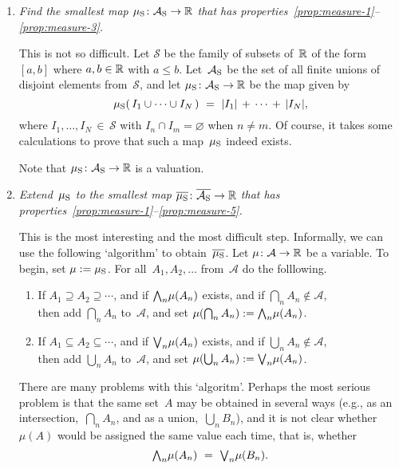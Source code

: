 \documentclass[main.tex]{subfiles}
\begin{document}
\begin{enumerate}
\item
\emph{Find the smallest map $\mu_{\mathrm{S}}\colon \mathcal{A}_{\mathrm{S}}\rightarrow \mathbb{R}$
that has properties~\ref{prop:measure-1}--\ref{prop:measure-3}.}

This is not so difficult.
Let $\mathcal{S}$ be the family of subsets of~$\mathbb{R}$ of
the form~$[a,b]$ where $a,b\in \mathbb{R}$ with $a\leq b$.
Let~$\mathcal{A}_{\mathrm{S}}$ be the set of all finite unions
of disjoint elements from~$\mathcal{S}$,
and let $\mu_{\mathrm{S}}\colon \mathcal{A}_{\mathrm{S}}\rightarrow \mathbb{R}$
be the map given by
\begin{equation*}
\mu_{\mathrm{S}}(\,I_1 \cup\dotsb\cup I_N\,) \ = \ |I_1| \,+\,\dotsb\,+\,|I_N|,
\end{equation*}
where $I_1,\dotsc,I_N\,\in\, \mathcal{S}$
with $I_n\cap I_m = \varnothing$ when $n\neq m$.
Of course, it takes some calculations
to prove that such a map~$\mu_{\mathrm{S}}$ indeed exists.

Note that $\mu_{\mathrm{S}}\colon \mathcal{A}_{\mathrm{S}}\rightarrow \mathbb{R}$ is a valuation.

\item
\emph{Extend~$\mu_{\mathrm{S}}$
to the smallest map $\overline{\mu_{\mathrm{S}}}\colon\overline{\mathcal{A}_{\mathrm{S}}}\rightarrow\mathbb{R}$
that has properties~\ref{prop:measure-1}--\ref{prop:measure-5}.}

This is the most interesting and the most difficult step.
Informally,
we can use the following `algorithm' to obtain~$\overline{\mu_{\mathrm{S}}}$.
Let $\mu\colon\mathcal{A} \rightarrow \mathbb{R}$
be a variable. To begin, set $\mu := \mu_{\mathrm{S}}$.
For all~$A_1,A_2,\dotsc$ from~$\mathcal{A}$ do the folllowing.
\begin{enumerate}
\item If $A_1 \supseteq A_2 \supseteq \dotsb$,
and if $\textstyle{\bigwedge}_n \mu(A_n)$ exists,
and if $\bigcap_n A_n \notin \mathcal{A}$,\\
then add $\bigcap_n A_n$ to~$\mathcal{A}$,
and set $\mu(\bigcap_n A_n) := \textstyle{\bigwedge}_n \mu(A_n)$.
\item If $A_1 \subseteq A_2 \subseteq \dotsb$,
and if $\textstyle{\bigvee}_n \mu(A_n)$ exists,
and if $\bigcup_n A_n \notin \mathcal{A}$,\\
then add $\bigcup_n A_n$ to~$\mathcal{A}$,
and set $\mu(\bigcup_n A_n) := \textstyle{\bigvee}_n \mu(A_n)$.
\end{enumerate}
There are many problems with this `algoritm'.
Perhaps the most serious problem
is that the same set~$A$ may be obtained
in several ways
(e.g., as an intersection,~$\bigcap_n A_n$,
and as a union,~$\bigcup_n B_n$),
and it is not clear whether 
$\mu(A)$ would be assigned the same value each time,
that is, 
whether 
\begin{equation*}
\textstyle{\bigwedge}_n \mu(A_n)\  =\  \textstyle{\bigvee}_n \mu(B_n).
\end{equation*}



\end{enumerate}
\end{document}
